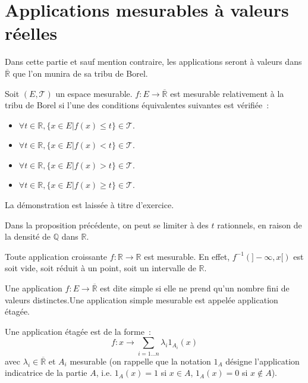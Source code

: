 \section{Applications mesurables à valeurs réelles}
Dans cette partie et sauf mention contraire, les applications seront à
valeurs dans $\overline{\mathbb{R}}$ que l'on munira de sa tribu de Borel. 
\begin{mandatory}
\begin{prop}
Soit $(E, \mathcal{T})$ un espace mesurable. $f : E \to
\overline{\mathbb{R}}$ est  mesurable relativement à la tribu de Borel si l'une
des conditions équivalentes suivantes est vérifiée~:
\begin{itemize}
\item $\forall t \in \mathbb{R}, \{x \in E | f(x) \leq t \} \in
\mathcal{T}$.
\item $\forall t \in \mathbb{R}, \{x \in E | f(x) < t \} \in
\mathcal{T}$.
\item $\forall t \in \mathbb{R}, \{x \in E | f(x) > t \} \in
\mathcal{T}$.
\item $\forall t \in \mathbb{R}, \{x \in E | f(x) \geq t \} \in
\mathcal{T}$.
\end{itemize}
\end{prop}
\end{mandatory}
La démonstration est laissée à titre d'exercice.
\begin{rem}
Dans la proposition précédente, on peut se limiter à des $t$ rationnels, en
raison de la densité de $\mathbb{Q}$ dans $\mathbb{R}$.
\end{rem}

 Toute application croissante $f: \mathbb{R} \to \mathbb{R}$ est mesurable. En
effet, $f^{-1}(]-\infty, x [)$ est soit vide, soit réduit à un point,
soit un intervalle de $\mathbb{R}$.
\begin{mandatory}
\begin{defn}
Une application $f : E \to \overline{\mathbb{R}}$ est dite simple si
elle ne prend qu'un nombre fini de valeurs distinctes.Une application simple
mesurable est appelée application étagée.
\end{defn}
\end{mandatory}

Une application étagée est de la forme~:
\[
f : x \to \sum_{i=1 \dots n} \lambda_i 1_{A_i}(x)
\]
avec $\lambda_i \in \overline{\mathbb{R}}$ et $A_i$ mesurable (on
rappelle que la notation $1_A$ désigne l'application indicatrice de la
partie $A$, i.e. $1_A(x) = 1$ si $x \in A$, $1_A(x) = 0$ si $x \notin
A$).



